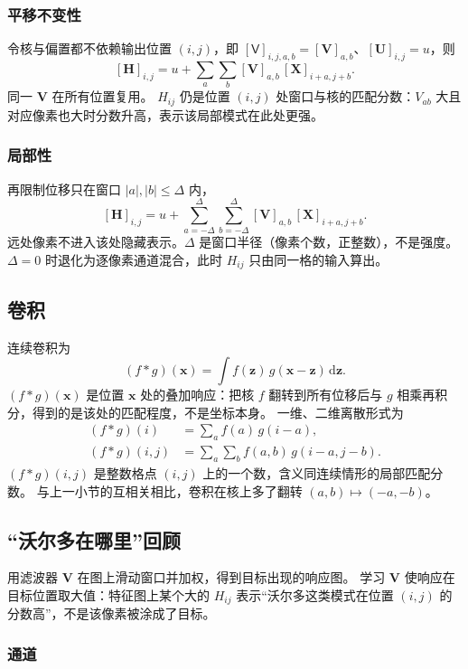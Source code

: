 \subsubsection{平移不变性}

令核与偏置都不依赖输出位置 $(i,j)$，即 $[\mathsf{V}]_{i,j,a,b}=[\bm{V}]_{a,b}$、$[\bm{U}]_{i,j}=u$，则
\[
[\bm{H}]_{i,j}
=
u
+
\sum_{a}\sum_{b}
[\bm{V}]_{a,b}\,[\bm{X}]_{i+a,j+b}.
\]
同一 $\bm{V}$ 在所有位置复用。
$H_{ij}$ 仍是位置 $(i,j)$ 处窗口与核的匹配分数：$V_{ab}$ 大且对应像素也大时分数升高，表示该局部模式在此处更强。

\subsubsection{局部性}

再限制位移只在窗口 $|a|,|b|\le\Delta$ 内，
\[
[\bm{H}]_{i,j}
=
u
+
\sum_{a=-\Delta}^{\Delta}\sum_{b=-\Delta}^{\Delta}
[\bm{V}]_{a,b}\,[\bm{X}]_{i+a,j+b}.
\]
远处像素不进入该处隐藏表示。$\Delta$ 是窗口半径（像素个数，正整数），不是强度。
$\Delta=0$ 时退化为逐像素通道混合，此时 $H_{ij}$ 只由同一格的输入算出。

\subsection{卷积}

连续卷积为
\[
(f*g)(\bm{x})
=
\int f(\bm{z})\,g(\bm{x}-\bm{z})\,\mathrm{d}\bm{z}.
\]
$(f*g)(\bm{x})$ 是位置 $\bm{x}$ 处的叠加响应：把核 $f$ 翻转到所有位移后与 $g$ 相乘再积分，得到的是该处的匹配程度，不是坐标本身。
一维、二维离散形式为
\begin{align*}
(f*g)(i)
&=
\sum_{a}f(a)\,g(i-a),\\
(f*g)(i,j)
&=
\sum_{a}\sum_{b}f(a,b)\,g(i-a,j-b).
\end{align*}
$(f*g)(i,j)$ 是整数格点 $(i,j)$ 上的一个数，含义同连续情形的局部匹配分数。
与上一小节的互相关相比，卷积在核上多了翻转 $(a,b)\mapsto(-a,-b)$。

\subsection{“沃尔多在哪里”回顾}

用滤波器 $\bm{V}$ 在图上滑动窗口并加权，得到目标出现的响应图。
学习 $\bm{V}$ 使响应在目标位置取大值：特征图上某个大的 $H_{ij}$ 表示“沃尔多这类模式在位置 $(i,j)$ 的分数高”，不是该像素被涂成了目标。

\subsubsection{通道}


